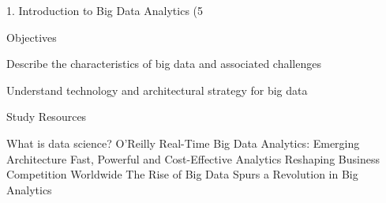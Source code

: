 1. Introduction to Big Data Analytics (5%

Objectives

Describe the characteristics of big data and associated challenges

Understand technology and architectural strategy for big data

Study Resources

What is data science? O’Reilly
Real-Time Big Data Analytics: Emerging Architecture
Fast, Powerful and Cost-Effective Analytics Reshaping Business Competition Worldwide
The Rise of Big Data Spurs a Revolution in Big Analytics
